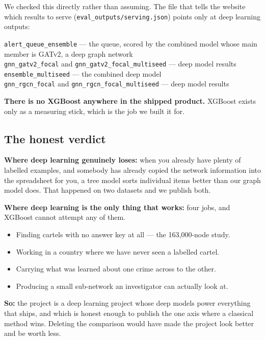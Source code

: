 \documentclass[11pt,a4paper]{article}
\newcommand{\code}[1]{\texttt{\small #1}}
\begin{document}
We checked this directly rather than assuming. The file that tells the website
which results to serve (\code{eval\_outputs/serving.json}) points only at deep
learning outputs:

\begin{plain}
\code{alert\_queue\_ensemble} --- the queue, scored by the combined model whose
main member is GATv2, a deep graph network\\
\code{gnn\_gatv2\_focal} and \code{gnn\_gatv2\_focal\_multiseed} --- deep model results\\
\code{ensemble\_multiseed} --- the combined deep model\\
\code{gnn\_rgcn\_focal} and \code{gnn\_rgcn\_focal\_multiseed} --- deep model results
\end{plain}

\textbf{There is no XGBoost anywhere in the shipped product.} XGBoost exists only
as a measuring stick, which is the job we built it for.

\subsection{The honest verdict}

\begin{keybox}
\textbf{Where deep learning genuinely loses:} when you already have plenty of
labelled examples, and somebody has already copied the network information into
the spreadsheet for you, a tree model sorts individual items better than our
graph model does. That happened on two datasets and we publish both.

\textbf{Where deep learning is the only thing that works:} four jobs, and
XGBoost cannot attempt any of them.

\begin{itemize}
  \item Finding cartels with no answer key at all --- the 163{,}000-node study.
  \item Working in a country where we have never seen a labelled cartel.
  \item Carrying what was learned about one crime across to the other.
  \item Producing a small sub-network an investigator can actually look at.
\end{itemize}

\textbf{So:} the project is a deep learning project whose deep models power
everything that ships, and which is honest enough to publish the one axis where a
classical method wins. Deleting the comparison would have made the project look
better and be worth less.
\end{keybox}
\end{document}
